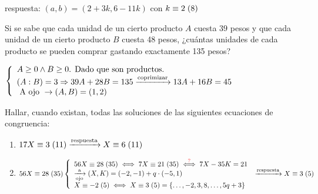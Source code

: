 \documentclass[12pt,a4paper, spanish]{article}
\begin{document}
\separadorCorto
respuesta: $(a,b) = (2+3k, 6-11k)$ con $k \equiv 2 \;(8)$\\

\ejercicio
Si se sabe que cada unidad de un cierto producto $A$ cuesta $39$ pesos y que cada unidad de un cierto
producto $B$ cuesta 48 pesos, ¿cuántas unidades de cada producto se pueden comprar gastando exactamente
135 pesos?

\separadorCorto

$
	\llave{l}{
		A \geq 0 \y B \geq 0 \text{. Dado que son productos.}\\
		(A:B) = 3 \entonces 39A + 28B = 135
		\flecha{coprimizar}
		13A + 16B = 45\\
		\text{ A ojo } \to (A,B) = (1,2)
	}
$

\ejercicio
Hallar, cuando existan, todas las soluciones de las siguientes ecuaciones de congruencia:

\separadorCorto

\begin{enumerate}[label=\roman*)]
	\item $\congruencia{17X}{3}{11} \flecha{respuesta} \congruencia{X}{6}{11} $\\

	\item $\congruencia{56X}{28}{35}\\
		      \llave{l}{
			      \congruencia{56X}{28}{35} \sisolosi
			      \congruencia{7X}{21}{35} \stackrel{\red{?}}\sisolosi
			      7X - 35K = 21\\
			      \flecha{a}[ojo] (X,K) = (-2,-1) + q \cdot (-5, 1)\\
			      \congruencia{X}{-2}{5} \sisolosi \congruencia{X}{3}{5} = \set{\dots, -2, 3, 8, \dots, 5q+3}
		      }\\
		      \flecha{respuesta} \congruencia{X}{3}{5} $
\end{enumerate}

\separadorCorto
\end{document}
